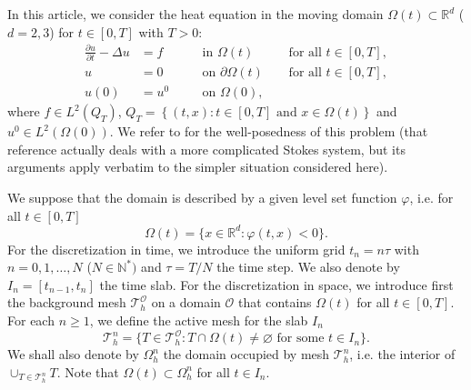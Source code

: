 \documentclass[11pt,a4paper]{article}
\theoremstyle{plain}
\theoremstyle{definition}
\theoremstyle{remark}
\numberwithin{equation}{section}
\begin{document}
In this article, we consider the heat equation in the moving domain $\Omega (t)\subset \mathbb{R} ^d$ ($d=2,3$) for $t\in [0,T]$ with $T>0$:
\begin{subequations}\label{eq:heat}
\begin{alignat}{3}
	\frac{\partial u}{\partial t} - \Delta u &= f && \quad \text{in } \Omega (t)  && \text{ for all } t \in [0, T], \\
	u &= 0 && \quad \text{on } \partial \Omega (t) && \text{ for all } t \in [0, T], \\
	u(0) &= u^0 && \quad \text{on } \Omega (0), &&
\end{alignat}
\end{subequations}
where {$f\in L^2(Q_T)$, $Q_T = \left\{ (t, x) : t \in [0, T] \text{ and } x \in \Omega (t) \right\}$}
and $u^0\in L^2(\Omega(0))$. We refer to \cite{burman2022eulerian} for the well-posedness of this {problem (that reference actually deals with a more complicated Stokes system, but its arguments apply verbatim to the simpler situation considered here).}


We suppose that the domain is described by a given level set function $\varphi$, i.e. for all $t\in[0,T]$
\[ \Omega (t) = \{x \in \mathbb{R}^d : \varphi (t, x) < 0\}. \]
For the discretization in time, we introduce the uniform grid $t_n = n \tau$ with
$n = 0, 1, \ldots, N$ ($N\in\mathbb{N}^*)$ and $\tau=T/N$ the time step. We also denote by $I_n = [t_{n -
	1}, t_n]$ the time slab. For the discretization in space, we introduce first the
background mesh $\mathcal{T}_h^{\mathcal{O}}$ on a domain $\mathcal{O}$ that
contains  $\Omega (t)$ {for all $t\in[0,T]$.} For each $n \geqslant 1$, we define
the active mesh for the slab $I_n$
\[ \mathcal{T}_h^n = \{T \in \mathcal{T}_h^{\mathcal{O}} : T \cap \Omega (t)\neq \varnothing \text{ for some } t \in I_n \}.
\]
We shall also denote by $\Omega_h^n$ the domain occupied by mesh $\mathcal{T}_h^n$, i.e. the interior of $\cup_{T\in\mathcal{T}_h^n}T$. {Note that $\Omega(t)\subset\Omega_h^n$ for all $t\in I_n$.}
\end{document}
